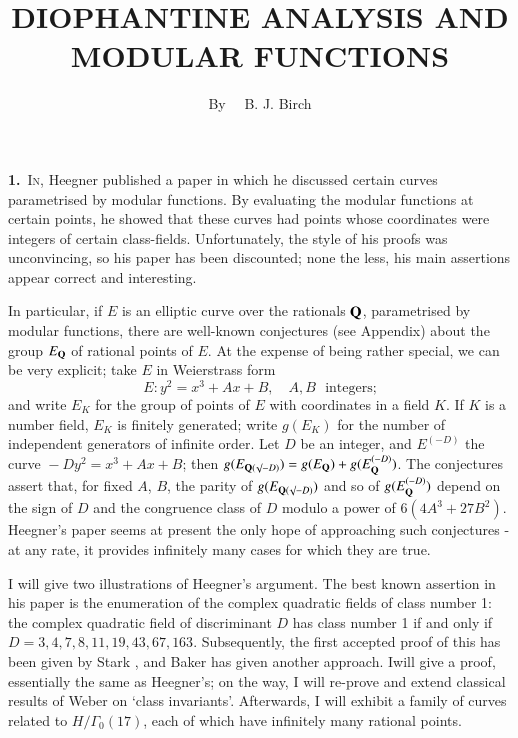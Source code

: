 \title{DIOPHANTINE ANALYSIS AND MODULAR FUNCTIONS}

\author{By~~ B. J. Birch}

\date{}

\maketitle

\setcounter{pageoriginal}{34}
\noindent
{\bf 1.}~\textsc{In}, Heegner published a paper \cite{art03-key5} in which he discussed certain curves parametrised by modular functions. By evaluating the modular functions at certain points, he showed that these curves had points whose coordinates were integers of certain class-fields. Unfortunately, the style of his proofs was unconvincing, so his paper has been discounted; none the less, his main assertions appear correct and interesting.

In particular, if $E$ is an elliptic curve over the rationals $\mathbf{Q}$, parametrised by modular functions, there are well-known conjectures (see Appendix) about the group $E_{\mathbf{Q}}$ of rational points of $E$. At the expense of being rather special, we can be very explicit; take $E$ in Weierstrass form
$$
E:y^{2}=x^{3}+Ax+B,\quad A, B \text{~ integers;}
$$
and write $E_{K}$ for the group of points of $E$ with coordinates in a field $K$. If $K$ is a number field, $E_{K}$ is finitely generated; write $g(E_{K})$ for the number of independent generators of infinite order. Let $D$ be an integer, and $E^{(-D)}$ the curve ${}-Dy^{2}=x^{3}+Ax+B$; then $g(E_{\mathbf{Q}(\surd-D)})=g(E_{\mathbf{Q}})+g(E_{\mathbf{Q}}^{(-D)})$. The conjectures assert that, for fixed $A$, $B$, the parity of $g(E_{\mathbf{Q}(\surd-D)})$ and so of $g(E_{\mathbf{Q}}^{(-D)})$ depend on the sign of $D$ and the congruence class of $D$ modulo a power of $6(4A^{3}+27B^{2})$. Heegner's paper seems at present the only hope of approaching such conjectures - at any rate, it provides infinitely many cases for which they are true.

I will give two illustrations of Heegner's argument. The best known assertion in his paper is the enumeration of the complex quadratic fields of class number 1: the complex quadratic field of discriminant $D$ has class number 1 if and only if $D=3,4,7,8,11,19,43,67,163$. Subsequently, the first accepted proof of this has been given by Stark \cite{art03-key7}, and Baker \cite{art03-key1} has given another approach. I\pageoriginale will give a proof, essentially the same as Heegner's; on the way, I will re-prove and extend classical results of Weber \cite{art03-key9} on `class invariants'. Afterwards, I will exhibit a family of curves related to $H/\Gamma_{0}(17)$, each of which have infinitely many rational points.

